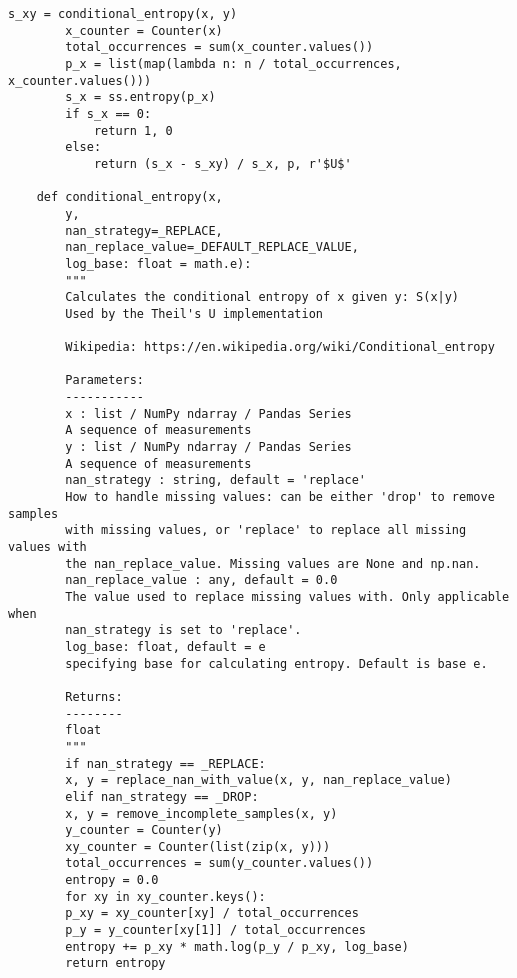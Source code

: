 \begin{lstlisting}[basicstyle=\tiny, style=py, caption={Compute Correlation Function}, label=lst:compute_correlation]
        s_xy = conditional_entropy(x, y)
        x_counter = Counter(x)
        total_occurrences = sum(x_counter.values())
        p_x = list(map(lambda n: n / total_occurrences, x_counter.values()))
        s_x = ss.entropy(p_x)
        if s_x == 0:
            return 1, 0
        else:
            return (s_x - s_xy) / s_x, p, r'$U$' 

    def conditional_entropy(x,
        y,
        nan_strategy=_REPLACE,
        nan_replace_value=_DEFAULT_REPLACE_VALUE,
        log_base: float = math.e):
        """
        Calculates the conditional entropy of x given y: S(x|y)
        Used by the Theil's U implementation

        Wikipedia: https://en.wikipedia.org/wiki/Conditional_entropy

        Parameters:
        -----------
        x : list / NumPy ndarray / Pandas Series
        A sequence of measurements
        y : list / NumPy ndarray / Pandas Series
        A sequence of measurements
        nan_strategy : string, default = 'replace'
        How to handle missing values: can be either 'drop' to remove samples
        with missing values, or 'replace' to replace all missing values with
        the nan_replace_value. Missing values are None and np.nan.
        nan_replace_value : any, default = 0.0
        The value used to replace missing values with. Only applicable when
        nan_strategy is set to 'replace'.
        log_base: float, default = e
        specifying base for calculating entropy. Default is base e.

        Returns:
        --------
        float
        """
        if nan_strategy == _REPLACE:
        x, y = replace_nan_with_value(x, y, nan_replace_value)
        elif nan_strategy == _DROP:
        x, y = remove_incomplete_samples(x, y)
        y_counter = Counter(y)
        xy_counter = Counter(list(zip(x, y)))
        total_occurrences = sum(y_counter.values())
        entropy = 0.0
        for xy in xy_counter.keys():
        p_xy = xy_counter[xy] / total_occurrences
        p_y = y_counter[xy[1]] / total_occurrences
        entropy += p_xy * math.log(p_y / p_xy, log_base)
        return entropy
\end{lstlisting}

